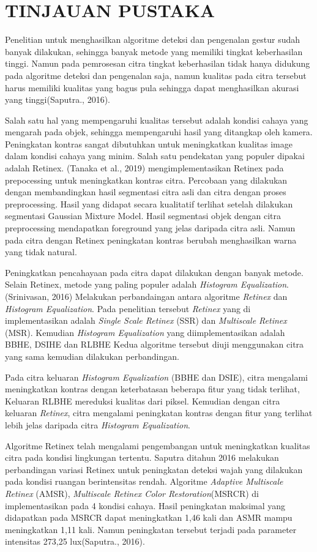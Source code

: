 \chapter{TINJAUAN PUSTAKA} 
Penelitian untuk menghasilkan algoritme deteksi dan pengenalan gestur sudah banyak dilakukan, sehingga banyak metode yang memiliki tingkat keberhasilan tinggi. Namun pada pemrosesan citra tingkat keberhasilan tidak hanya didukung pada algoritme deteksi dan pengenalan saja, namun kualitas pada citra tersebut harus memiliki kualitas yang bagus pula sehingga dapat menghasilkan akurasi yang tinggi(Saputra., 2016).

Salah satu hal yang mempengaruhi kualitas tersebut adalah kondisi cahaya yang mengarah pada objek, sehingga mempengaruhi hasil yang ditangkap oleh kamera. Peningkatan kontras sangat dibutuhkan untuk meningkatkan kualitas image dalam kondisi cahaya yang minim. Salah satu pendekatan yang populer dipakai adalah Retinex. (Tanaka et al., 2019) mengimplementasikan Retinex pada prepocessing untuk meningkatkan kontras citra. Percobaan yang dilakukan dengan membandingkan hasil segmentasi citra asli dan citra dengan proses preprocessing. Hasil yang didapat secara kualitatif terlihat setelah dilakukan segmentasi Gaussian Mixture Model. Hasil segmentasi objek dengan citra preprocessing mendapatkan foreground yang jelas daripada citra asli. Namun pada citra dengan Retinex peningkatan kontras berubah menghasilkan warna yang tidak natural.

Peningkatkan pencahayaan pada citra dapat dilakukan dengan banyak metode. Selain Retinex, metode yang paling populer adalah \emph{Histogram Equalization}. (Srinivasan, 2016) Melakukan perbandaingan antara algoritme \emph{Retinex} dan \emph{Histogram Equalization}. Pada penelitian tersebut \emph{Retinex} yang di implementasikan adalah \emph{Single Scale Retinex} (SSR) dan \emph{Multiscale Retinex} (MSR). Kemudian \emph{Histogram Equalization} yang diimplementasikan adalah BBHE, DSIHE dan RLBHE Kedua algoritme tersebut diuji menggunakan citra yang sama kemudian dilakukan perbandingan. 

Pada citra keluaran \emph{Histogram Equalization} (BBHE dan DSIE), citra mengalami meningkatkan kontras dengan keterbatasan beberapa fitur yang tidak terlihat, Keluaran RLBHE mereduksi kualitas dari piksel. Kemudian dengan citra keluaran \emph{Retinex}, citra mengalami peningkatan kontras dengan fitur yang terlihat lebih jelas daripada citra \emph{Histogram Equalization}.

Algoritme Retinex telah mengalami pengembangan untuk meningkatkan kualitas citra pada kondisi lingkungan tertentu. Saputra ditahun 2016 melakukan perbandingan variasi Retinex untuk peningkatan deteksi wajah yang dilakukan pada kondisi ruangan berintensitas rendah. Algoritme \emph{Adaptive Multiscale Retinex} (AMSR), \emph{Multiscale Retinex Color Restoration}(MSRCR) di implementasikan pada 4 kondisi cahaya. Hasil peningkatan maksimal yang didapatkan pada MSRCR dapat meningkatkan 1,46 kali dan ASMR mampu meningkatkan 1,11 kali. Namun peningkatan tersebut terjadi pada parameter intensitas 273,25 lux(Saputra., 2016).


